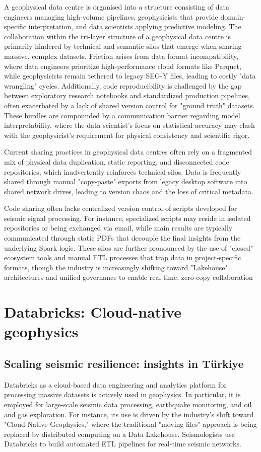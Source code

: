 \documentclass[data,article,submit,pdftex,moreauthors]{Definitions/mdpi}
\begin{document}
A geophysical data centre is organised into a structure consisting of data engineers managing high-volume pipelines, geophysicists that provide domain-specific interpretation, and data scientists applying predictive modeling. The collaboration within the tri-layer structure of a geophysical data centre is primarily hindered by technical and semantic silos that emerge when sharing massive, complex datasets. Friction arises from data format incompatibility, where data engineers prioritize high-performance cloud formats like Parquet, while geophysicists remain tethered to legacy SEG-Y files, leading to costly "data wrangling" cycles. Additionally, code reproducibility is challenged by the gap between exploratory research notebooks and standardized production pipelines, often exacerbated by a lack of shared version control for "ground truth" datasets. These hurdles are compounded by a communication barrier regarding model interpretability, where the data scientist's focus on statistical accuracy may clash with the geophysicist’s requirement for physical consistency and scientific rigor.

Current sharing practices in geophysical data centres often rely on a fragmented mix of physical data duplication, static reporting, and disconnected code repositories, which inadvertently reinforces technical silos. Data is frequently shared through manual "copy-paste" exports from legacy desktop software into shared network drives, leading to version chaos and the loss of critical metadata. 

Code sharing often lacks centralized version control of scripts developed for seismic signal processing. For instance, specialized scripts may reside in isolated repositories or being exchanged via email, while main results are typically communicated through static PDFs that decouple the final insights from the underlying Spark logic. These silos are further pronounced by the use of "closed" ecosystem tools and manual ETL processes that trap data in project-specific formats, though the industry is increasingly shifting toward "Lakehouse" architectures and unified governance to enable real-time, zero-copy collaboration

\section{Databricks: Cloud-native geophysics}

\subsection{Scaling seismic resilience: insights in Türkiye}
Databricks as a cloud-based data engineering and analytics platform for processing massive datasets is actively used in geophysics. In particular, it is employed for large-scale seismic data processing, earthquake monitoring, and oil and gas exploration. For instance, its use is driven by the industry’s shift toward "Cloud-Native Geophysics," where the traditional "moving files" approach is being replaced by distributed computing on a Data Lakehouse. Seismologists use Databricks to build automated ETL pipelines for real-time seismic networks.
\end{document}
